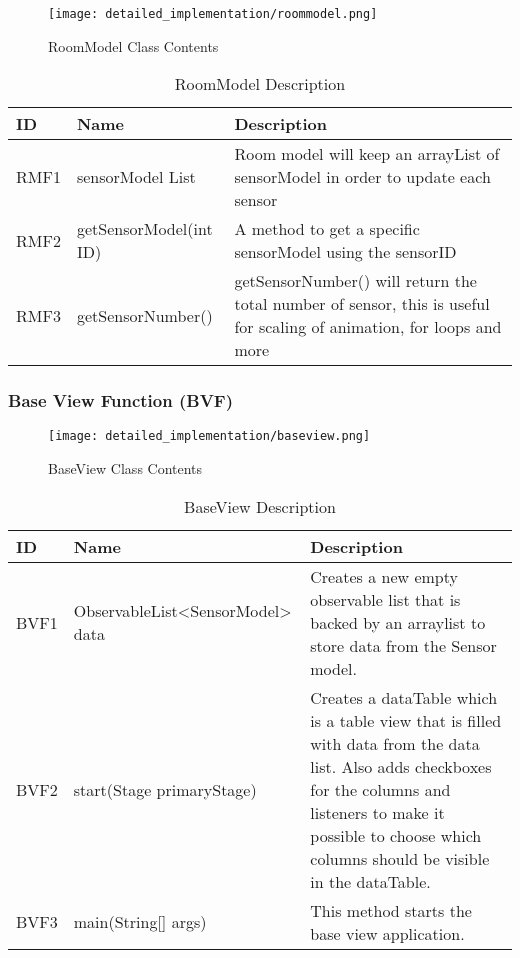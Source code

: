 \documentclass[../document]{subfiles}
\begin{document}
\begin{figure}[H]
\centering
\texttt{[image: detailed\_implementation/roommodel.png]}
\caption{RoomModel Class Contents}
\end{figure}

\begin{table}[H]
\caption{RoomModel Description}
\centering
\begin{tabularx}{\textwidth}{|l|l|X|}
	\hline
	ID
	&Name
	&Description
	\\ \hline RMF1
	&sensorModel List
	&Room model will keep an arrayList of sensorModel in order to update each sensor
	\\ \hline RMF2
	&getSensorModel(int ID)
	&A method to get a specific sensorModel using the sensorID
	\\ \hline RMF3
	&getSensorNumber()
	&getSensorNumber() will return the total number of sensor, this is useful for scaling of animation, for loops and more
	\\ \hline 
\end{tabularx}
\end{table}

\subsubsection{Base View Function (BVF)}

\begin{figure}[H]
\centering
\texttt{[image: detailed\_implementation/baseview.png]}
\caption{BaseView Class Contents}
\end{figure}

\begin{table}[H]
\caption{BaseView Description}
\centering
\begin{tabularx}{\textwidth}{|l|l|X|}
	\hline
	ID
	&Name
	&Description
	\\ \hline BVF1
	&ObservableList<SensorModel> data
	&Creates a new empty observable list that is backed by an arraylist to store data from the Sensor model.
	\\ \hline BVF2
	&start(Stage primaryStage)
	&Creates a dataTable which is a table view that is filled with data from the data list. Also adds checkboxes for the columns and listeners to make it possible to choose which columns should be visible in the dataTable.
	\\ \hline BVF3
	&main(String[] args)
	&This method starts the base view application.
	\\ \hline 
\end{tabularx}
\end{table}
\end{document}
